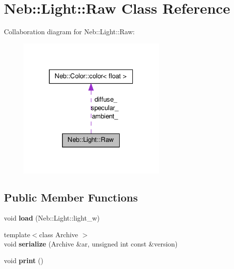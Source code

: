 \hypertarget{classNeb_1_1Light_1_1Raw}{\section{\-Neb\-:\-:\-Light\-:\-:\-Raw \-Class \-Reference}
\label{classNeb_1_1Light_1_1Raw}
}


\-Collaboration diagram for \-Neb\-:\-:\-Light\-:\-:\-Raw\-:\nopagebreak
\begin{figure}[H]
\begin{center}
\leavevmode
\includegraphics[width=208pt]{classNeb_1_1Light_1_1Raw__coll__graph}
\end{center}
\end{figure}
\subsection*{\-Public \-Member \-Functions}
\begin{DoxyCompactItemize}
\item 
\hypertarget{classNeb_1_1Light_1_1Raw_a73da93da875caf489900b66e4dd8739d}{void {\bfseries load} (\-Neb\-::\-Light\-::light\-\_\-w)}\label{classNeb_1_1Light_1_1Raw_a73da93da875caf489900b66e4dd8739d}

\item 
\hypertarget{classNeb_1_1Light_1_1Raw_ac13e53ee77bc00ed0650ca347079dde1}{{\footnotesize template$<$class Archive $>$ }\\void {\bfseries serialize} (\-Archive \&ar, unsigned int const \&version)}\label{classNeb_1_1Light_1_1Raw_ac13e53ee77bc00ed0650ca347079dde1}

\item 
\hypertarget{classNeb_1_1Light_1_1Raw_a1302f93b1622cc744e0a7f6936f24f41}{void {\bfseries print} ()}\label{classNeb_1_1Light_1_1Raw_a1302f93b1622cc744e0a7f6936f24f41}

\end{DoxyCompactItemize}
